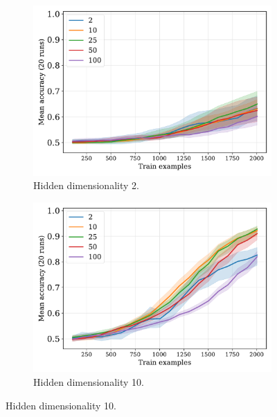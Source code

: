 \begin{figure}[H]
  \centering

  \begin{subfigure}{0.45\linewidth}
    \includegraphics[width=1\textwidth]{../fig/equality-train_size-embed_dim-hidden_dim=2.pdf}
    \caption{Hidden dimensionality 2.}
  \end{subfigure}
  \hfill
  \begin{subfigure}{0.45\linewidth}
    \includegraphics[width=1\textwidth]{../fig/equality-train_size-embed_dim-hidden_dim=10.pdf}
    \caption{Hidden dimensionality 10.}
  \end{subfigure}

  \vspace{24pt}


\end{figure}
